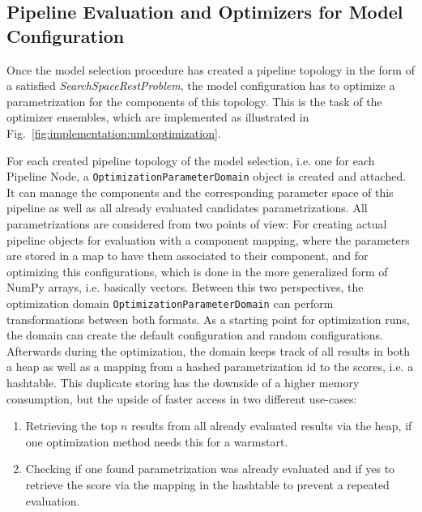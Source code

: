 \subsection{Pipeline Evaluation and Optimizers for Model Configuration}
\label{sec:implementation:components:optimization}
Once the model selection procedure has created a pipeline topology in the form of a satisfied \textit{SearchSpaceRestProblem}, the model configuration has to optimize a parametrization for the components of this topology.
This is the task of the optimizer ensembles, which are implemented as illustrated in Fig.~\ref{fig:implementation:uml:optimization}.

For each created pipeline topology of the model selection, i.e. one for each Pipeline Node, a \texttt{OptimizationParameterDomain} object is created and attached.
It can manage the components and the corresponding parameter space of this pipeline as well as all already evaluated candidates parametrizations.\newline
All parametrizations are considered from two points of view: For creating actual pipeline objects for evaluation with a component mapping, where the parameters are stored in a map to have them associated to their component, and for optimizing this configurations, which is done in the more generalized form of NumPy arrays, i.e. basically vectors.
Between this two perspectives, the optimization domain \texttt{OptimizationParameterDomain} can perform transformations between both formats.\newline
As a starting point for optimization runs, the domain can create the default configuration and random configurations.
Afterwards during the optimization, the domain keeps track of all results in both a heap as well as a mapping from a hashed parametrization id to the scores, i.e. a hashtable.
This duplicate storing has the downside of a higher memory consumption, but the upside of faster access in two different use-cases:
\begin{enumerate}
    \item Retrieving the top $n$ results from all already evaluated results via the heap, if one optimization method needs this for a warmstart.
    \item Checking if one found parametrization was already evaluated and if yes to retrieve the score via the mapping in the hashtable to prevent a repeated evaluation.
\end{enumerate}

